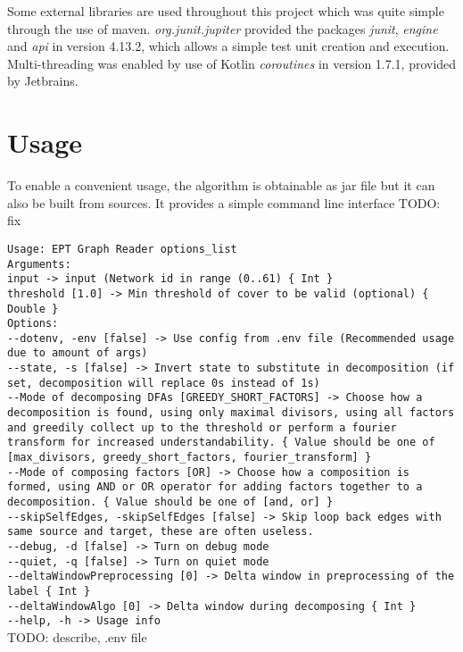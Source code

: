 Some external libraries are used throughout this project which was quite simple through the use of maven. \emph{org.junit.jupiter} provided the packages \emph{junit}, \emph{engine} and \emph{api} in version 4.13.2, which allows a simple test unit creation and execution. Multi-threading was enabled by use of Kotlin \emph{coroutines} in version 1.7.1, provided by Jetbrains.

\section{Usage}
To enable a convenient usage, the algorithm is obtainable as jar file but it can also be built from sources. It provides a simple command line interface
TODO: fix

\verb|Usage: EPT Graph Reader options_list|\\
\verb|Arguments: |\\
\verb|input -> input (Network id in range (0..61) { Int }|\\
\verb|threshold [1.0] -> Min threshold of cover to be valid (optional) { Double }|\\
\verb|Options: |\\
\verb|--dotenv, -env [false] -> Use config from .env file (Recommended usage due to amount of args) |\\
\verb|--state, -s [false] -> Invert state to substitute in decomposition (if set, decomposition will replace 0s instead of 1s) |\\
\verb|--Mode of decomposing DFAs [GREEDY_SHORT_FACTORS] -> Choose how a decomposition is found, using only maximal divisors, using all factors and greedily collect up to the threshold or perform a fourier transform for increased understandability. { Value should be one of [max_divisors, greedy_short_factors, fourier_transform] }|\\
\verb|--Mode of composing factors [OR] -> Choose how a composition is formed, using AND or OR operator for adding factors together to a decomposition. { Value should be one of [and, or] }|\\
\verb|--skipSelfEdges, -skipSelfEdges [false] -> Skip loop back edges with same source and target, these are often useless. |\\
\verb|--debug, -d [false] -> Turn on debug mode |\\
\verb|--quiet, -q [false] -> Turn on quiet mode |\\
\verb|--deltaWindowPreprocessing [0] -> Delta window in preprocessing of the label { Int }|\\
\verb|--deltaWindowAlgo [0] -> Delta window during decomposing { Int }|\\
\verb|--help, -h -> Usage info |\\

TODO: describe, .env file